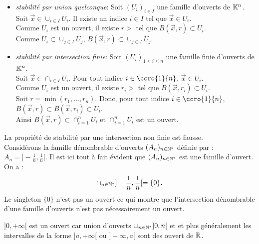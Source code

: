 \documentclass{book}
\begin{document}
\begin{Demonstration}
\begin{itemize}
\item \emph{stabilité par union quelconque}:
  Soit $(U_i)_{i\in I}$ une famille d'ouverts de $\mathbb{K}^n$.\\
  Soit $\vec{x}\in\cup_{i\in I} U_i$. Il existe un indice $i\in I$ tel que $\vec{x}\in U_i$.\\
  Comme $U_i$ est un ouvert, il existe $r>$ tel que $B(\vec{x},r)\subset U_i$.\\
  Comme  $U_i\subset \cup_{j\in I} U_j$, $B(\vec{x},r)\subset\cup_{j\in I} U_j$.
\item \emph{stabilité par intersection finie}:
  Soit $(U_i)_{1\leq i\leq n}$ une famille finie d'ouverts de $\mathbb{K}^n$.\\
 Soit $\vec{x}\in\cap_{i\in I} U_i$. Pour tout indice $i\in \ccro{1}{n}$, $\vec{x}\in U_i$.\\
  Comme $U_i$ est un ouvert, il existe $r_i>$ tel que $B(\vec{x},r_i)\subset U_i$.\\
  Soit $r=\min(r_1,\dots,r_n)$. Donc, pour tout indice $i\in \ccro{1}{n}$, $B(\vec{x},r)\subset B(\vec{x},r_i)\subset U_i$.\\
  Ainsi $B(\vec{x},r)\subset \cap_{i=1}^n U_i$ et $\cap_{i=1}^n U_i$ est un ouvert. 
\end{itemize}
\end{Demonstration}
\begin{Remarque} La propriété de stabilité par une intersection non finie est fausse.\\
Considérons la famille dénombrable d'ouverts $(A_n)_{n\in\mathbb{N}^*}$ définie par : $A_n =]-\frac 1 n ,\frac 1 n[$. 
Il est ici tout à fait évident que $(A_n)_{n\in\mathbb{N}^*}$ est une famille d'ouvert. On a :
$$\cap_{n\in\mathbb{N}^*}]-\frac 1 n ,\frac 1 n[=\{0\}.$$
Le singleton $\{0\}$ n'est pas un ouvert ce qui montre que l'intersection dénombrable d'une famille d'ouverts n'est
pas nécessairement un ouvert.
\end{Remarque}
\begin{Exemple}[Dans $\R$]
$]0,+\infty[$ est un ouvert car union d'ouverts $\cup_{n\in \mathbb{N}^*}]0,n[$ et et plus généralement les intervalles de la forme $]a,+\infty[$ ou $]-\infty,a[$ sont des ouvert de $\R$.
\end{Exemple}
\end{document}

